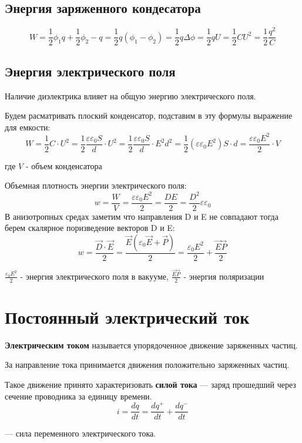 \documentclass[../main.tex]{subfiles}
\begin{document}
\subsection{Энергия заряженного кондесатора}

\[ W = \frac{1}{2}\phi_1 q + \frac{1}{2}\phi_2 -q = \frac{1}{2}q (\phi_1 - \phi_2) = \frac{1}{2} q \Delta \phi
    = \frac{1}{2} q U = \frac{1}{2} C U^2 =\frac{1}{2} \frac{q^2}{C}\]
\subsection{Энергия электрического поля}
Наличие диэлектрика влияет на общую энергию электрического поля.

Будем расматривать плоский конденсатор, подставим в эту формулы выражение для емкости:
\[ W = \frac{1}{2} C \cdot U^2 = \frac{1}{2} \frac{\varepsilon \varepsilon_0 S}{d} \cdot U^2 = \frac{1}{2} \frac{\varepsilon \varepsilon_0 S}{d} \cdot E^2 d^2 = \frac{1}{2}(\varepsilon \varepsilon_0 E^2) S \cdot d =
    \frac{\varepsilon \varepsilon_ 0 E^2}{2} \cdot V\]
\begin{center}
    где $V$ - объем конденсатора
\end{center}

Объемная плотность энергии электрического поля:
\[w = \frac{W}{V} = \frac{\varepsilon \varepsilon_ 0 E^2}{2} = \frac{D E}{2} = \frac{D^2}{2} \varepsilon \varepsilon_0\]
В анизотропных средах заметим что направления D и E не совпадают тогда берем скалярное поризведение векторов D и E:
\[w = \frac{\vec D \cdot \vec E}{2} = \frac{\vec E (\varepsilon_0 \vec E + \vec P)}{2} = \frac{\varepsilon_0 E^2}{2} + \frac{\vec E \vec P}{2}\]
\begin{center}
    $\frac{\varepsilon_0 E^2}{2}$ - энергия электрического поля в вакууме,
    \newline
    $\frac{\vec E \vec P}{2}$ - энергия поляризации
\end{center}

\section{Постоянный электрический ток}

 \textbf{Электрическим током} называется упорядоченное движение заряженных частиц.

За направление тока принимается движения положительно заряженных частиц.

 Такое движение принято характеризовать \textbf{силой тока}  --- заряд прошедший через сечение проводника за единицу времени.
\[i = \frac{dq}{dt} = \frac{dq ^{+}}{dt} + \frac{dq ^{-}}{dt}\] 
\begin{center}
    --- сила переменного электрического тока.
\end{center}
\end{document}
